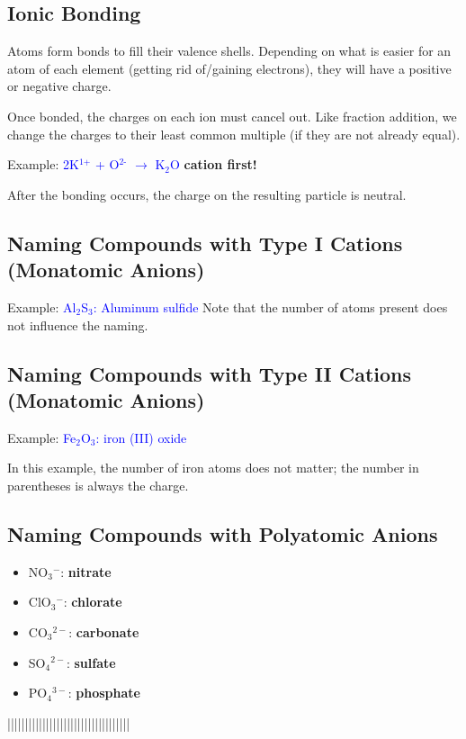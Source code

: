 \documentclass[a4paper, 12pt]{article}
\begin{document}
\subsection{Ionic Bonding}
Atoms form bonds to fill their valence shells. Depending on what is easier for an atom of each element (getting rid of/gaining electrons), they will have a positive or negative charge.

Once bonded, the charges on each ion must cancel out. Like fraction addition, we change the charges to their least common multiple (if they are not already equal).

Example: \textcolor{blue}{2K$^{\text{1+}}$ + O$^{\text{2-}}$ $\xrightarrow{}$ K$_2$O} \textbf{cation first!}

After the bonding occurs, the charge on the resulting particle is neutral.

\subsection{Naming Compounds with Type I Cations (Monatomic Anions)}

Example: \textcolor{blue}{Al$_2$S$_3$: Aluminum sulfide} 
Note that the number of atoms present does not influence the naming.

\subsection{Naming Compounds with Type II Cations (Monatomic Anions)}

Example: \textcolor{blue}{Fe$_2$O$_3$: iron (III) oxide}

In this example, the number of iron atoms does not matter; the number in parentheses is always the charge.

\subsection{Naming Compounds with Polyatomic Anions}
\begin{itemize}[leftmargin=*,nosep]
    \item NO$_3$$^-$: \textbf{nitrate}
    \item ClO$_3$$^-$: \textbf{chlorate}
    \item CO$_3$$^{2-}$: \textbf{carbonate}
    \item SO$_4$$^{2-}$: \textbf{sulfate}
    \item PO$_4$$^{3-}$: \textbf{phosphate}
\end{itemize}
|||||||||||||||||||||||||||||||||||
\end{document}
